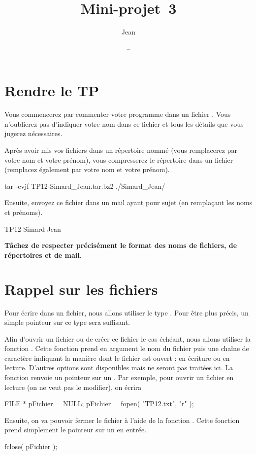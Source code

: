 \documentclass[a4paper]{article}
\title{Mini-projet~3}
\author{Jean \Nom{Simard}}
\date{\Date[l]{06}{11}{2008} -- \Date[l]{07}{11}{2008}}
\begin{document}
	\maketitle
	\section{Rendre le TP}
		Vous commencerez par commenter votre programme dans un fichier .
		Vous n'oublierez pas d'indiquer votre nom dans ce fichier et tous les détails que vous jugerez nécessaires.

		Après avoir mis vos fichiers dans un répertoire nommé  (vous remplacerez par votre nom et votre prénom), vous compresserez le répertoire dans un fichier  (remplacez également par votre nom et votre prénom).
		\begin{Code*}
tar -cvjf TP12-Simard_Jean.tar.bz2 ./Simard_Jean/
		\end{Code*}
		Ensuite, envoyez ce fichier dans un mail ayant pour sujet (en remplaçant les noms et prénoms).
		\begin{Code*}
[CCI] TP12 Simard Jean
		\end{Code*}
		
		\textbf{Tâchez de respecter précisément le format des noms de fichiers, de répertoires et de mail.}
		
	\section{Rappel sur les fichiers}
		Pour écrire dans un fichier, nous allons utiliser le type .
		Pour être plus précis, un simple pointeur sur ce type sera suffisant.
		
		Afin d'ouvrir un fichier ou de créer ce fichier le cas échéant, nous allons utiliser la fonction .
		Cette fonction prend en argument le nom du fichier puis une chaîne de caractère indiquant la manière dont le fichier est ouvert : en écriture ou en lecture.
		D'autres options sont disponibles mais ne seront pas traitées ici.
		La fonction renvoie un pointeur sur un .
		Par exemple, pour ouvrir un fichier  en lecture (on ne veut pas le modifier), on écrira
		\begin{Code*}
FILE * pFichier = NULL;
pFichier = fopen( "TP12.txt", "r" );
		\end{Code*}

		Ensuite, on va pouvoir fermer le fichier à l'aide de la fonction .
		Cette fonction prend simplement le pointeur sur un  en entrée.
		\begin{Code*}
fclose( pFichier );
		\end{Code*}
\end{document}
